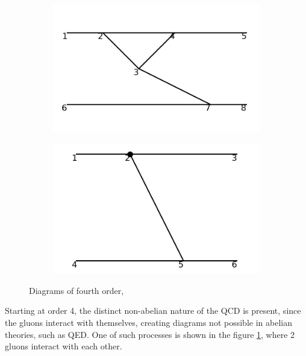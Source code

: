 \documentclass[11pt,a4paper,twoside,pdf]{article}
\numberwithin{equation}{section}
\begin{document}
\begin{figure}[h!]
    \centering
    \begin{subfigure}[t]{0.33\textwidth}
        \centering
        \includegraphics[width=\textwidth]{plots/order4/1.png}
        \caption{ }
    \end{subfigure}%
    \begin{subfigure}[t]{0.33\textwidth}
        \centering
        \includegraphics[width=\textwidth]{plots/order4/counterterms/1.png}
        \caption{ }
    \end{subfigure}
    \caption{Diagrams of fourth order,}
    \label{fig:order4/1}
\end{figure}

Starting at order 4, the distinct non-abelian nature of the QCD is present, since 
the gluons interact with themselves, creating diagrams not possible in abelian theories, 
such as QED. One of such processes is shown in the figure \ref{fig:order4/1}, where 2 gluons
interact with each other.
\end{document}
